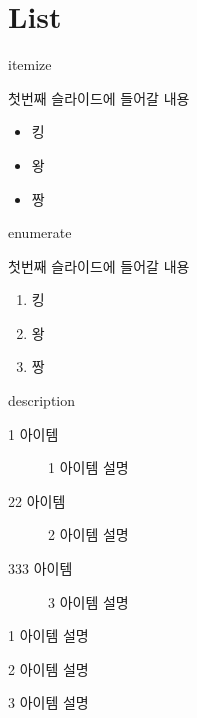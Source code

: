 \documentclass[10pt,xcolor=pdftex,dvipsnames,table,handout]{beamer}
\begin{document}
		\section{List}
		\begin{frame}[t]{itemize}

			첫번째 슬라이드에 들어갈 내용
			\begin{itemize}
			\item 킹
			\item 왕
			\item 짱
			\end{itemize}

		\end{frame}






		\begin{frame}[t]{enumerate}

			첫번째 슬라이드에 들어갈 내용
			\begin{enumerate}
			\item 킹
			\item 왕
			\item 짱
			\end{enumerate}

		\end{frame}




		\begin{frame}[t]{description}

		\begin{description}
			\item[1 아이템] 1 아이템 설명
			\item[22 아이템] 2 아이템 설명
			\item[333 아이템] 3 아이템 설명

		\end{description}


		\begin{description}[123456789012345]
			\item[1 아이템] 1 아이템 설명
			\item[22 아이템] 2 아이템 설명
			\item[333 아이템] 3 아이템 설명
		\end{description}

		\end{frame}
\end{document}
